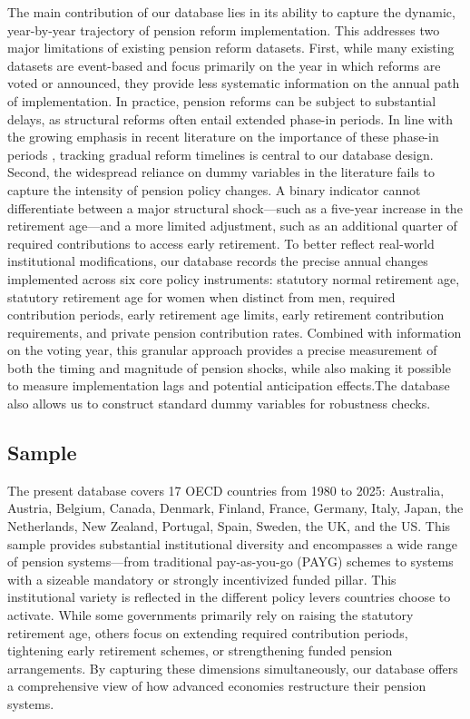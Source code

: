 \documentclass[11pt,english,a4paper, twoside, authoryear]{article}
\begin{document}
The main contribution of our database lies in its ability to capture the dynamic, year-by-year trajectory of pension reform implementation. This addresses two major limitations of existing pension reform datasets. First, while many existing datasets are event-based and focus primarily on the year in which reforms are voted or announced, they provide less systematic information on the annual path of implementation. In practice, pension reforms can be subject to substantial delays, as structural reforms often entail extended phase-in periods. In line with the growing emphasis in recent literature on the importance of these phase-in periods \citep{BiZubairy2023, romp_political_2024}, tracking gradual reform timelines is central to our database design. Second, the widespread reliance on dummy variables in the literature fails to capture the intensity of pension policy changes. A binary indicator cannot differentiate between a major structural shock---such as a five-year increase in the retirement age---and a more limited adjustment, such as an additional quarter of required contributions to access early retirement. To better reflect real-world institutional modifications, our database records the precise annual changes implemented across six core policy instruments: statutory normal retirement age, statutory retirement age for women when distinct from men, required contribution periods, early retirement age limits, early retirement contribution requirements, and private pension contribution rates. Combined with information on the voting year, this granular approach provides a precise measurement of both the timing and magnitude of pension shocks, while also making it possible to measure implementation lags and potential anticipation effects.The database also allows us to construct standard dummy variables for robustness checks.


\subsection{Sample}
The present database covers 17 OECD countries from 1980 to 2025: Australia, Austria, Belgium, Canada, Denmark, Finland, France, Germany, Italy, Japan, the Netherlands, New Zealand, Portugal, Spain, Sweden, the UK, and the US. This sample provides substantial institutional diversity and encompasses a wide range of pension systems---from traditional pay-as-you-go (PAYG) schemes to systems with a sizeable mandatory or strongly incentivized funded pillar. This institutional variety is reflected in the different policy levers countries choose to activate. While some governments primarily rely on raising the statutory retirement age, others focus on extending required contribution periods, tightening early retirement schemes, or strengthening funded pension arrangements. By capturing these dimensions simultaneously, our database offers a comprehensive view of how advanced economies restructure their pension systems.
\end{document}
